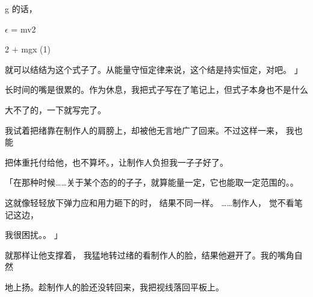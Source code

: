 g 的话，\par
$\epsilon$ = mv2\par
2 + mgx (1)\par
就可以结结为这个式子了。从能量守恒定律来说，这个结是持实恒定，对吧。 」\par
长时间的嘴是很累的。作为休息，我把式子写在了笔记上，但式子本身也不是什么\par
大不了的，一下就写完了。\par
我试着把绪靠在制作人的肩膀上，却被他无言地广了回来。不过这样一来， 我也能\par
把体重托付给他，也不算坏。，让制作人负担我一子子好了。\par
「在那种时候……关于某个态的的子子，就算能量一定，它也能取一定范围的。。\par
这就像轻轻放下弹力应和用力砸下的时， 结果不同一样。 ……制作人， 觉不看笔记这边，\par
我很困扰。。 」\par
就那样让他支撑着， 我猛地转过绪的看制作人的脸，结果他避开了。我的嘴角自然\par
地上扬。趁制作人的脸还没转回来，我把视线落回平板上。\par

